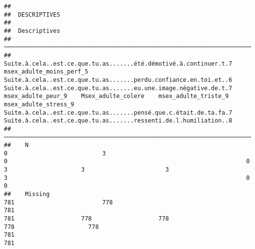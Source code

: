 \documentclass[
]{article}
\begin{document}
\begin{verbatim}
## 
##  DESCRIPTIVES
## 
##  Descriptives                                                                                                                                                                                                                                                                                                                                                                                                                                                                                 
##  ──────────────────────────────────────────────────────────────────────────────────────────────────────────────────────────────────────────────────────────────────────────────────────────────────────────────────────────────────────────────────────────────────────────────────────────────────────────────────────────────────────────────────────────────────────────────────────────────────────────────────────────────────────────────────────────────────────────────────────────── 
##               Suite.à.cela..est.ce.que.tu.as.......été.démotivé.à.continuer.t.7    msex_adulte_moins_perf_5    Suite.à.cela..est.ce.que.tu.as.......perdu.confiance.en.toi.et..6    Suite.à.cela..est.ce.que.tu.as.......eu.une.image.négative.de.t.7    msex_adulte_peur_9    Msex_adulte_colere    msex_adulte_triste_9    msex_adulte_stress_9    Suite.à.cela..est.ce.que.tu.as.......pensé.que.c.était.de.ta.fa.7    Suite.à.cela..est.ce.que.tu.as.......ressenti.de.l.humiliation..8   
##  ──────────────────────────────────────────────────────────────────────────────────────────────────────────────────────────────────────────────────────────────────────────────────────────────────────────────────────────────────────────────────────────────────────────────────────────────────────────────────────────────────────────────────────────────────────────────────────────────────────────────────────────────────────────────────────────────────────────────────────────── 
##    N                                                                          0                           3                                                                    0                                                                    0                     3                     3                       3                       3                                                                    0                                                                    0   
##    Missing                                                                  781                         778                                                                  781                                                                  781                   778                   778                     778                     778                                                                  781                                                                  781   

\end{verbatim}
\end{document}
